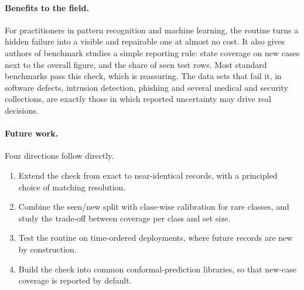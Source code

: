 \paragraph{Benefits to the field.} For practitioners in pattern recognition and machine learning, the routine turns a hidden failure into a visible and repairable one at almost no cost. It also gives authors of benchmark studies a simple reporting rule: state coverage on new cases next to the overall figure, and the share of seen test rows. Most standard benchmarks pass this check, which is reassuring. The data sets that fail it, in software defects, intrusion detection, phishing and several medical and security collections, are exactly those in which reported uncertainty may drive real decisions.

\paragraph{Future work.} Four directions follow directly.
\begin{enumerate}
\item Extend the check from exact to near-identical records, with a principled choice of matching resolution.
\item Combine the seen/new split with class-wise calibration for rare classes, and study the trade-off between coverage per class and set size.
\item Test the routine on time-ordered deployments, where future records are new by construction.
\item Build the check into common conformal-prediction libraries, so that new-case coverage is reported by default.
\end{enumerate}
